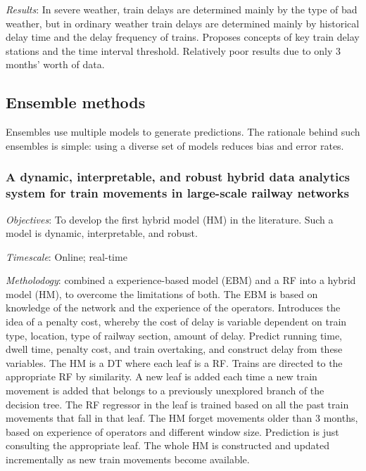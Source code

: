 \documentclass{article}
\begin{document}
\smallskip

\textit{Results}: In severe weather, train delays are determined mainly by the type of bad weather, but in ordinary weather train delays are determined mainly by historical delay time and the delay frequency of trains. Proposes concepts of key train delay stations and the time interval threshold. Relatively poor results due to only 3 months' worth of data.

\subsection{Ensemble methods}

Ensembles use multiple models to generate predictions. The rationale behind such ensembles is simple: using a diverse set of models reduces bias and error rates.

\subsubsection{A dynamic, interpretable, and robust hybrid data analytics system for train movements in large-scale railway networks \cite{oneto_et_al_2019}}

\textit{Objectives}: To develop the first hybrid model (HM) in the literature. Such a model is dynamic, interpretable, and robust.

\smallskip

\textit{Timescale}: Online; real-time

\smallskip

\textit{Metholodogy}: combined a experience-based model (EBM) and a RF into a hybrid model (HM), to overcome the limitations of both. The EBM is based on knowledge of the network and the experience of the operators.  Introduces the idea of a penalty cost, whereby the cost of delay is variable dependent on train type, location, type of railway section, amount of delay. Predict running time, dwell time, penalty cost, and train overtaking, and construct delay from these variables. The HM is a DT where each leaf is a RF. Trains are directed to the appropriate RF by similarity. A new leaf is added each time a new train movement is added that belongs to a previously unexplored branch of the decision tree. The RF regressor in the leaf is trained based on all the past train movements that fall in that leaf. The HM forget movements older than 3 months, based on experience of operators and different window size. Prediction is just consulting the appropriate leaf. The whole HM is constructed and updated incrementally as new train movements become available.
\end{document}
